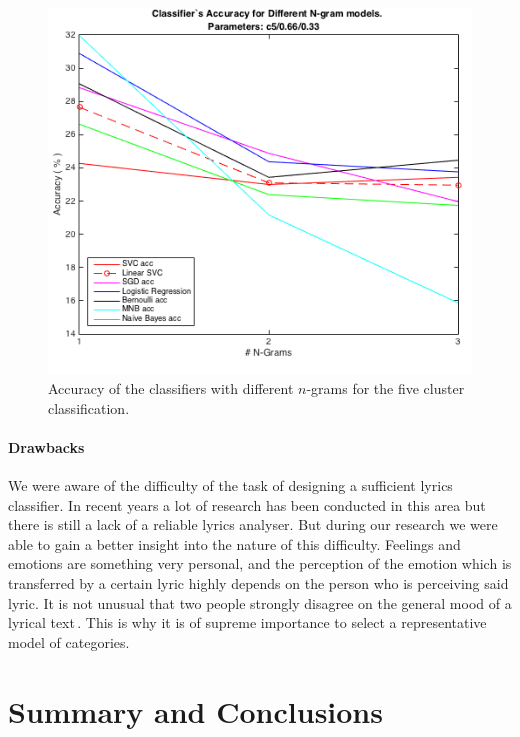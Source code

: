 \documentclass[a4paper,12pt]{article}
\begin{document}
\begin{figure}
\centering
\includegraphics[scale=0.5]{pl2}
\caption{Accuracy of the classifiers with different $n$-grams for the five cluster classification.}
\label{fig:nGramCluster}
\end{figure}


\paragraph{Drawbacks} We were aware of the difficulty of the task of designing a sufficient lyrics classifier. In recent years a lot of research has been conducted in this area but there is still a lack of a reliable lyrics analyser. But during our research we were able to gain a better insight into the nature of this difficulty. Feelings and emotions are something very personal, and the perception of the emotion which is transferred by a certain lyric highly depends on the person who is perceiving said lyric. It is not unusual that two people strongly disagree on the general mood of a lyrical text\,\cite{wilson2005recognizing}. This is why it is of supreme importance to select a representative model of categories.
 



\section{Summary and Conclusions}
\label{sec:summary}
\end{document}
